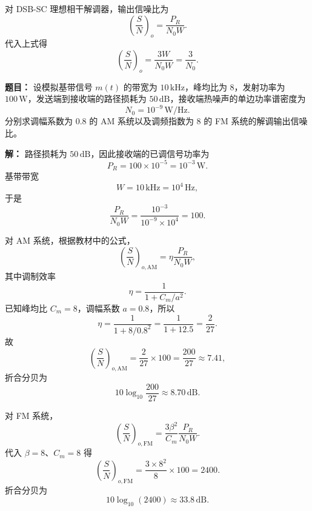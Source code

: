 对 DSB-SC 理想相干解调器，输出信噪比为
\[
\left(\frac{S}{N}\right)_o=\frac{P_R}{N_0W}.
\]
代入上式得
\[
\left(\frac{S}{N}\right)_o=\frac{3W}{N_0W}=\frac{3}{N_0}.
\]

\medskip
{}
\textbf{题目：}
设模拟基带信号 $m(t)$ 的带宽为 $10\,\mathrm{kHz}$，峰均比为 $8$，发射功率为 $100\,\mathrm{W}$，发送端到接收端的路径损耗为 $50\,\mathrm{dB}$，接收端热噪声的单边功率谱密度为
\[
N_0=10^{-9}\,\mathrm{W/Hz}.
\]
分别求调幅系数为 $0.8$ 的 AM 系统以及调频指数为 $8$ 的 FM 系统的解调输出信噪比。

\par\textbf{解：}
路径损耗为 $50\,\mathrm{dB}$，因此接收端的已调信号功率为
\[
P_R=100\times 10^{-5}=10^{-3}\,\mathrm{W}.
\]
基带带宽
\[
W=10\,\mathrm{kHz}=10^4\,\mathrm{Hz},
\]
于是
\[
\frac{P_R}{N_0W}=\frac{10^{-3}}{10^{-9}\times 10^4}=100.
\]

对 AM 系统，根据教材中的公式，
\[
\left(\frac{S}{N}\right)_{o,\mathrm{AM}}=\eta\frac{P_R}{N_0W},
\]
其中调制效率
\[
\eta=\frac{1}{1+C_m/a^2}.
\]
已知峰均比 $C_m=8$，调幅系数 $a=0.8$，所以
\[
\eta=\frac{1}{1+8/0.8^2}=\frac{1}{1+12.5}=\frac{2}{27}.
\]
故
\[
\left(\frac{S}{N}\right)_{o,\mathrm{AM}}=\frac{2}{27}\times 100=\frac{200}{27}\approx 7.41,
\]
折合分贝为
\[
10\log_{10}\frac{200}{27}\approx 8.70\,\mathrm{dB}.
\]

对 FM 系统，
\[
\left(\frac{S}{N}\right)_{o,\mathrm{FM}}
=\frac{3\beta^2}{C_m}\frac{P_R}{N_0W}.
\]
代入 $\beta=8$、$C_m=8$ 得
\[
\left(\frac{S}{N}\right)_{o,\mathrm{FM}}
=\frac{3\times 8^2}{8}\times 100
=2400.
\]
折合分贝为
\[
10\log_{10}(2400)\approx 33.8\,\mathrm{dB}.
\]

\medskip
